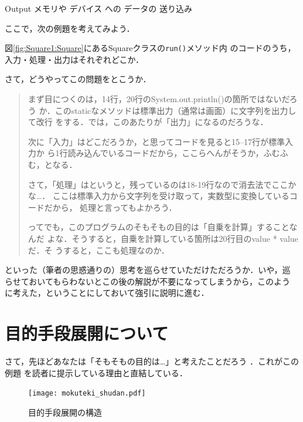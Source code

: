 \documentclass[a4j, twoside]{jsbook}
\begin{document}
Output
 メモリや
 デバイス
 への
 データの
 送り込み


ここで，次の例題を考えてみよう．

\begin{例題}
 図\ref{fig:Square1:Square}にあるSquareクラスの\texttt{run()}メソッド内
 のコードのうち，入力・処理・出力はそれぞれどこか．
\end{例題}

さて，どうやってこの問題をとこうか．

\begin{quotation}
まず目につくのは，14行，20行のSystem.out.println()の箇所ではないだろう
か．このstaticなメソッドは標準出力（通常は画面）に文字列を出力して改行
をする．では，このあたりが「出力」になるのだろうな．

次に「入力」はどこだろうか，と思ってコードを見ると15--17行が標準入力か
ら1行読み込んでいるコードだから，ここらへんがそうか，ふむふむ，となる．

さて，「処理」はというと，残っているのは18-19行なので消去法でここかな…．
ここは標準入力から文字列を受け取って，実数型に変換しているコードだから，
処理と言ってもよかろう．

ってでも，このプログラムのそもそもの目的は「自乗を計算」することなんだ
よな．そうすると，自乗を計算している箇所は20行目のvalue * valueだ．そ
うすると，ここも処理なのか．
\end{quotation}

といった（筆者の思惑通りの）思考を巡らせていただけただろうか．いや，巡
らせておいてもらわないとこの後の解説が不要になってしまうから，このよう
に考えた，ということにしておいて強引に説明に進む．

\section{目的手段展開について}
さて，先ほどあなたは「そもそもの目的は…」と考えたことだろう
．これがこの例題
を読者に提示している理由と直結している．

\begin{figure}
 \begin{center}
  \texttt{[image: mokuteki\_shudan.pdf]}
  \caption{目的手段展開の構造}
 \end{center}
\end{figure}
\end{document}
